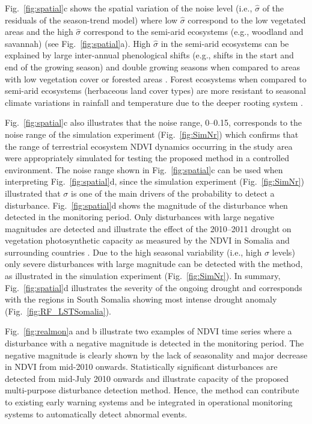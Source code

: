 \documentclass[authoryear,preprint,review,10pt]{elsarticle}
\begin{document}
Fig.~\ref{fig:spatial}c shows the spatial variation of the noise level (i.e., $\hat \sigma$ of the residuals of the season-trend model) where low $\hat \sigma$ correspond to the low vegetated areas and the high $\hat \sigma$ correspond to the semi-arid ecosystems (e.g., woodland and savannah) (see Fig.~\ref{fig:spatial}a). High $\hat \sigma$  in the semi-arid ecosystems can be explained by large inter-annual phenological shifts (e.g., shifts in the start and end of the growing season) and double growing seasons when compared to areas with low vegetation cover or forested areas \citep{Verbesselt:2010wo, Brown:2010fq}. Forest ecosystems when compared to semi-arid ecosystems (herbaceous land cover types) are more resistant to seasonal climate variations in rainfall and temperature due to the deeper rooting system \citep{Verbesselt2006}. 

Fig.~\ref{fig:spatial}c also illustrates that the noise range, 0--0.15, corresponds to the noise range of the simulation experiment (Fig.~\ref{fig:SimNr}) which confirms that the range of terrestrial ecosystem NDVI dynamics occurring in the study area were appropriately simulated for testing the proposed method in a controlled environment. 
The noise range shown in Fig.~\ref{fig:spatial}c can be used when interpreting Fig.~\ref{fig:spatial}d, since the simulation experiment (Fig.~\ref{fig:SimNr}) illustrated that $\sigma$ is one of the main drivers of the probability to detect a disturbance. Fig.~\ref{fig:spatial}d shows the magnitude of the disturbance when detected in the monitoring period. Only disturbances with large negative magnitudes are detected and illustrate the effect of the 2010--2011 drought on vegetation photosynthetic capacity as measured by the NDVI in Somalia and surrounding countries \citep{Funk:2011fg}. Due to the high seasonal variability (i.e., high $\sigma$ levels) only severe disturbances with large magnitude can be detected with the method, as illustrated in the simulation experiment (Fig.~\ref{fig:SimNr}). In summary, Fig.~\ref{fig:spatial}d illustrates the severity of the ongoing drought and corresponds with the regions in South Somalia showing most intense drought anomaly (Fig.~\ref{fig:RF_LSTSomalia}).

Fig.~\ref{fig:realmon}a and b illustrate two examples of NDVI time series where a disturbance with a negative magnitude is detected in the monitoring period. The negative magnitude is clearly shown by the lack of seasonality and major decrease in NDVI from mid-2010 onwards. Statistically significant disturbances are detected from mid-July 2010 onwards and illustrate capacity of the proposed multi-purpose disturbance detection method. Hence, the method can contribute to existing early warning systems and be integrated in operational monitoring systems to automatically detect abnormal events. 
\end{document}
